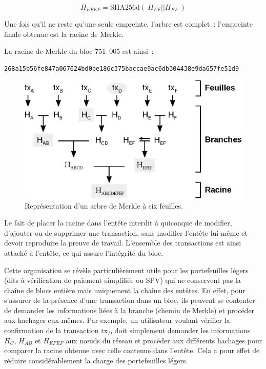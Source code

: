 { \small
\[
H_{E\!F\!E\!F} = \mathrm{SHA256d}(~H_{E\!F} || H_{E\!F}~)
\]
}

Une fois qu'il ne reste qu'une seule empreinte, l'arbre est complet~: l'empreinte finale obtenue est la racine de Merkle.

La racine de Merkle du bloc 751~005 est ainsi~:

\begin{Verbatim}[fontsize=\footnotesize]
268a15b56fe847a067624bd0be186c375baccae9ac6db304438e9da657fe51d9
\end{Verbatim}

\begin{figure}[h]
  \centering
  \includegraphics[scale=0.8]{img/merkle-tree.eps}
  \caption{Représentation d'un arbre de Merkle à six feuilles.}
  \label{fig:merkle-tree}
\end{figure}

Le fait de placer la racine dans l'entête interdit à quiconque de modifier, d'ajouter ou de supprimer une transaction, sans modifier l'entête lui-même et devoir reproduire la preuve de travail. L'ensemble des transactions est ainsi attaché à l'entête, ce qui assure l'intégrité du bloc.

Cette organisation se révèle particulièrement utile pour les portefeuilles légers (dits à vérification de paiement simplifiée ou SPV) qui ne conservent pas la chaîne de blocs entière mais uniquement la chaîne des entêtes. En effet, pour s'assurer de la présence d'une transaction dans un bloc, ils peuvent se contenter de demander les informations liées à la branche (chemin de Merkle) et procéder aux hachages eux-mêmes. Par exemple, un utilisateur voulant vérifier la confirmation de la transaction $\mathrm{tx}_D$ doit simplement demander les informations $H_C$, $H_{A\!B}$ et $H_{E\!F\!E\!F}$ aux nœuds du réseau et procéder aux différents hachages pour comparer la racine obtenue avec celle contenue dans l'entête. Cela a pour effet de réduire considérablement la charge des portefeuilles légers.


